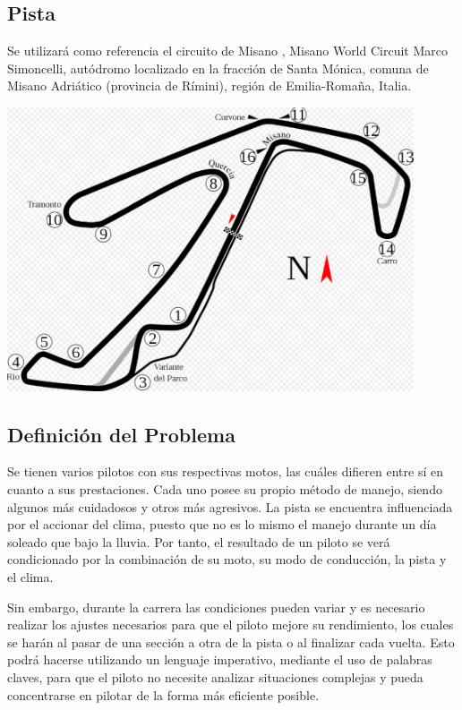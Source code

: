 \documentclass[12pt, letterpaper,spanish]{article}
\theoremstyle{definition}
\theoremstyle{remark}
\begin{document}
	\subsection{Pista}
	Se utilizará como referencia el circuito de Misano {\footnotesize \cite{misano}}, Misano World Circuit Marco Simoncelli, autódromo localizado en la fracción de Santa Mónica, comuna de Misano Adriático (provincia de Rímini), región de Emilia-Romaña, Italia. 
	
	\begin{center}
		\includegraphics[width = 12cm]{circuito} 
	\end{center}

	\subsection{Definición del Problema}
	Se tienen varios pilotos con sus respectivas motos, las cuáles difieren entre sí en cuanto a sus prestaciones. Cada uno posee su propio método de manejo, siendo algunos más cuidadosos y otros más agresivos. La pista se encuentra influenciada por el accionar del clima, puesto que no es lo mismo el manejo durante un día soleado que bajo la lluvia. Por tanto, el resultado de un piloto se verá condicionado por la combinación de su moto, su modo de conducción, la pista y el clima.

	Sin embargo, durante la carrera las condiciones pueden variar y es necesario realizar los ajustes necesarios para que el piloto mejore su rendimiento, los cuales se harán al pasar de una sección a otra de la pista o al finalizar cada vuelta. Esto podrá hacerse utilizando un lenguaje imperativo, mediante el uso de palabras claves, para que el piloto no necesite analizar situaciones complejas y pueda concentrarse en pilotar de la forma más eficiente posible.
\end{document}
